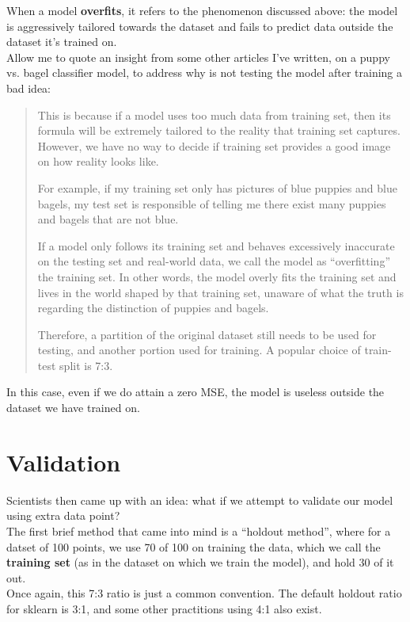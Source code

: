 When a model \textbf{overfits}, it refers to the phenomenon discussed above: the model is aggressively tailored towards the dataset and fails to predict data outside the dataset it's trained on. \\
Allow me to quote an insight from some other articles I've written, on a puppy vs. bagel classifier model, to address why is not testing the model after training a bad idea:
\begin{quote}
    This is because if a model uses too much data from training set, then its formula will be extremely tailored to the reality that training set captures.
    However, we have no way to decide if training set provides a good image on how reality looks like.
    
    For example, if my training set only has pictures of blue puppies and blue bagels, my test set is responsible of telling me there exist many puppies and bagels that are not blue.
    
    If a model only follows its training set and behaves excessively inaccurate on the testing set and real-world data, we call the model as “overfitting” the training set.
    In other words, the model overly fits the training set and lives in the world shaped by that training set, unaware of what the truth is regarding the distinction of puppies and bagels.
    
    Therefore, a partition of the original dataset still needs to be used for testing, and another portion used for training. A popular choice of train-test split is 7:3.
\end{quote}
In this case, even if we do attain a zero MSE, the model is useless outside the dataset we have trained on.

\section{Validation}
Scientists then came up with an idea: what if we attempt to validate our model using extra data point? \\
The first brief method that came into mind is a ``holdout method'', where for a datset of 100 points, we use 70 of 100 on training the data, which we call the \textbf{training set} (as in the dataset on which we train the model), and hold 30 of it out. \\
Once again, this 7:3 ratio is just a common convention. The default holdout ratio for sklearn is 3:1, and some other practitions using 4:1 also exist. \\

